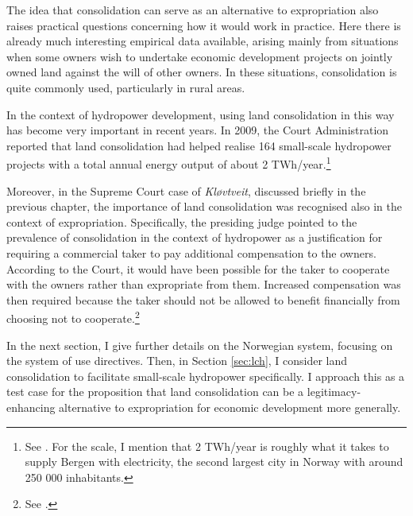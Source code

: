 The idea that consolidation can serve as an alternative to expropriation also raises practical questions concerning how it would work in practice. Here there is already much interesting empirical data available, arising mainly from situations when some owners wish to undertake economic development projects on jointly owned land against the will of other owners. In these situations, consolidation is quite commonly used, particularly in rural areas.

In the context of hydropower development, using land consolidation in this way has become very important in recent years. In 2009, the Court Administration reported that land consolidation had helped realise 164 small-scale hydropower projects with a total annual energy output of about 2 TWh/year.\footnote{See \cite{gevinst09}. For the scale, I mention that 2 TWh/year is roughly what it takes to supply Bergen with electricity, the second largest city in Norway with around 250 000 inhabitants.}

Moreover, in the Supreme Court case of {\it Kløvtveit}, discussed briefly in the previous chapter, the importance of land consolidation was recognised also in the context of expropriation. Specifically, the presiding judge pointed to the prevalence of consolidation in the context of hydropower as a justification for requiring a commercial taker to pay additional compensation to the owners. According to the Court, it would have been possible for the taker to cooperate with the owners rather than expropriate from them. Increased compensation was then required because the taker should not be allowed to benefit financially from choosing not to cooperate.\footnote{See \cite{klovtveit11}.}

In the next section, I give further details on the Norwegian system, focusing on the system of use directives. Then, in Section \ref{sec:lch}, I consider land consolidation to facilitate small-scale hydropower specifically. I approach this as a test case for the proposition that land consolidation can be a legitimacy-enhancing alternative to expropriation for economic development more generally.


